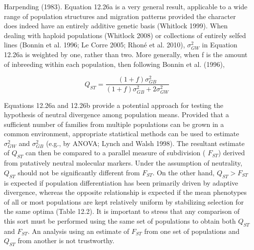 \documentclass{article}
\begin{document}
Harpending (1983). Equation 12.26a is a very general result, applicable to a wide range of population structures and migration patterns provided the character does indeed have an entirely additive genetic basis (Whitlock 1999). When dealing with haploid populations (Whitlock 2008) or collections of entirely selfed lines (Bonnin et al. 1996; Le Corre 2005; Rhoné et al. 2010),  $ \sigma_{GW}^2 $ in Equation 12.26a is weighted by one, rather than two. More generally, when f is the amount of inbreeding within each population, then following Bonnin et al. (1996),

\begin{equation}
Q_{ST}=\frac{(1+f)\sigma_{GB}^{2}}{(1+f)\sigma_{GB}^{2}+2\sigma_{GW}^{2}}
\tag{12.26b}
\label{eq:12_26b}
\end{equation}

Equations 12.26a and 12.26b provide a potential approach for testing the hypothesis of neutral divergence among population means. Provided that a sufficient number of families from multiple populations can be grown in a common environment, appropriate statistical methods can be used to estimate  $ \sigma_{GW}^{2} $ and  $ \sigma_{GB}^{2} $ (e.g., by ANOVA; Lynch and Walsh 1998). The resultant estimate of  $ Q_{ST} $ can then be compared to a parallel measure of subdivision ( $ F_{ST} $) derived from putatively neutral molecular markers. Under the assumption of neutrality,  $ Q_{ST} $ should not be significantly different from  $ F_{ST} $. On the other hand,  $ Q_{ST} > F_{ST} $ is expected if population differentiation has been primarily driven by adaptive divergence, whereas the opposite relationship is expected if the mean phenotypes of all or most populations are kept relatively uniform by stabilizing selection for the same optima (Table 12.2). It is important to stress that any comparison of this sort must be performed using the same set of populations to obtain both  $ Q_{ST} $ and  $ F_{ST} $. An analysis using an estimate of  $ F_{ST} $ from one set of populations and  $ Q_{ST} $ from another is not trustworthy.
\end{document}
